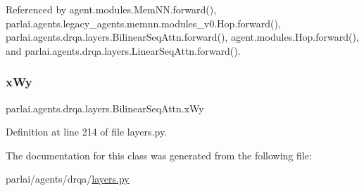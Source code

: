 Referenced by agent.\+modules.\+Mem\+N\+N.\+forward(), parlai.\+agents.\+legacy\+\_\+agents.\+memnn.\+modules\+\_\+v0.\+Hop.\+forward(), parlai.\+agents.\+drqa.\+layers.\+Bilinear\+Seq\+Attn.\+forward(), agent.\+modules.\+Hop.\+forward(), and parlai.\+agents.\+drqa.\+layers.\+Linear\+Seq\+Attn.\+forward().

\mbox{\label{classparlai_1_1agents_1_1drqa_1_1layers_1_1BilinearSeqAttn_a6a14946097618712765aba7243f0c075}} 
\subsubsection{\texorpdfstring{x\+Wy}{xWy}}
{\footnotesize\ttfamily parlai.\+agents.\+drqa.\+layers.\+Bilinear\+Seq\+Attn.\+x\+Wy}



Definition at line 214 of file layers.\+py.



The documentation for this class was generated from the following file\+:\begin{DoxyCompactItemize}
\item 
parlai/agents/drqa/\hyperlink{layers_8py}{layers.\+py}\end{DoxyCompactItemize}
